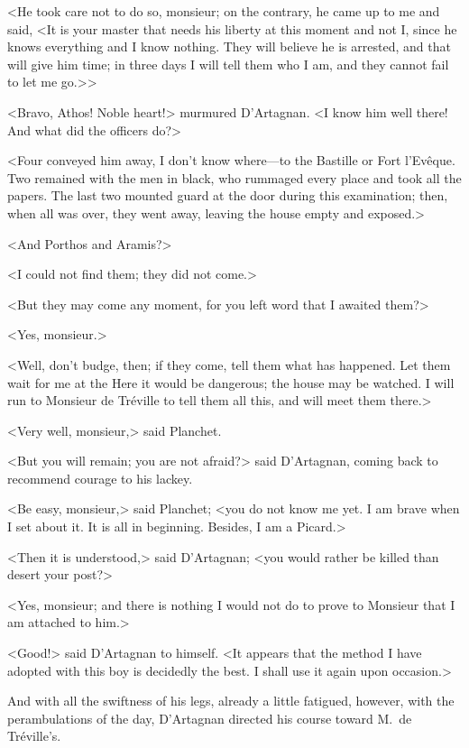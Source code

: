 <He took care not to do so, monsieur; on the contrary, he came up to me and said, <It is your master that needs his liberty at this moment and not I, since he knows everything and I know nothing. They will believe he is arrested, and that will give him time; in three days I will tell them who I am, and they cannot fail to let me go.>> 

<Bravo, Athos! Noble heart!> murmured D'Artagnan. <I know him well there! And what did the officers do?> 

<Four conveyed him away, I don't know where—to the Bastille or Fort l'Evêque. Two remained with the men in black, who rummaged every place and took all the papers. The last two mounted guard at the door during this examination; then, when all was over, they went away, leaving the house empty and exposed.> 

<And Porthos and Aramis?> 

<I could not find them; they did not come.> 

<But they may come any moment, for you left word that I awaited them?> 

<Yes, monsieur.> 

<Well, don't budge, then; if they come, tell them what has happened. Let them wait for me at the  Here it would be dangerous; the house may be watched. I will run to Monsieur de Tréville to tell them all this, and will meet them there.> 

<Very well, monsieur,> said Planchet. 

<But you will remain; you are not afraid?> said D'Artagnan, coming back to recommend courage to his lackey. 

<Be easy, monsieur,> said Planchet; <you do not know me yet. I am brave when I set about it. It is all in beginning. Besides, I am a Picard.> 

<Then it is understood,> said D'Artagnan; <you would rather be killed than desert your post?> 

<Yes, monsieur; and there is nothing I would not do to prove to Monsieur that I am attached to him.> 

<Good!> said D'Artagnan to himself. <It appears that the method I have adopted with this boy is decidedly the best. I shall use it again upon occasion.> 

And with all the swiftness of his legs, already a little fatigued, however, with the perambulations of the day, D'Artagnan directed his course toward M.~de Tréville's. 

